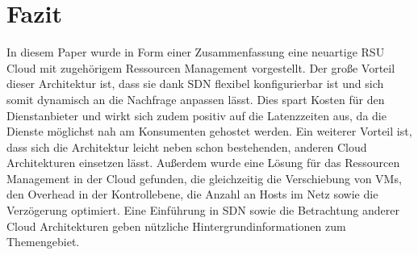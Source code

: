 \documentclass[conference]{IEEEtran}
\begin{document}
\section{Fazit}

In diesem Paper wurde in Form einer Zusammenfassung eine neuartige RSU Cloud mit zugehörigem Ressourcen Management vorgestellt. Der große Vorteil dieser Architektur ist, dass sie dank SDN flexibel konfigurierbar ist und sich somit dynamisch an die Nachfrage anpassen lässt. Dies spart Kosten für den Dienstanbieter und wirkt sich zudem positiv auf die Latenzzeiten aus, da die Dienste möglichst nah am Konsumenten gehostet werden. Ein weiterer Vorteil ist, dass sich die Architektur leicht neben schon bestehenden, anderen Cloud Architekturen einsetzen lässt.
Außerdem wurde eine Lösung für das Ressourcen Management in der Cloud gefunden, die gleichzeitig die Verschiebung von VMs, den Overhead in der Kontrollebene, die Anzahl an Hosts im Netz sowie die Verzögerung optimiert.
Eine Einführung in SDN sowie die Betrachtung anderer Cloud Architekturen geben nützliche Hintergrundinformationen zum Themengebiet.




%
%
%

\newpage
\end{document}
